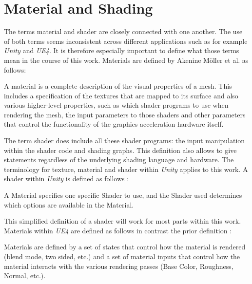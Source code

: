 \section{Material and Shading}\label{chapter:materials}

	The terms material and shader are closely connected with one another. The use of both terms seems inconsistent across different applications such as for example \emph{Unity} and \emph{UE4}. It is therefore especially important to define what those terms mean in the course of this work. Materials are defined by Akenine Möller et al. \cite[p.\,468]{akenine2008real} as follows:
	
	\begin{itquote}	
		A material is a complete description of the visual properties of a mesh. This includes a specification of the textures that are mapped to its surface and also various higher-level properties, such as which shader programs to use when rendering the mesh, the input parameters to those shaders and other parameters that control the functionality of the graphics acceleration hardware itself.
	\end{itquote} %

	The term shader does include all these shader programs: the input manipulation within the shader code and shading graphs. This definition also allows to give statements regardless of the underlying shading language and hardware. The terminology for texture, material and shader within \emph{Unity} applies to this work. A shader within \emph{Unity} is defined as follows \cite{unity2017textureShaderMat}: 

	\begin{itquote}
		A Material specifies one specific Shader to use, and the Shader used determines which options are available in the Material.
	\end{itquote} %
	This simplified definition of a shader will work for most parts within this work. Materials within \emph{UE4} are defined as follows in contrast the prior definition \cite{epic2017materialDef}:
	\begin{itquote}		
		Materials are defined by a set of states that control how the material is rendered (blend mode, two sided, etc.) and a set of material inputs that control how the material interacts with the various rendering passes (Base Color, Roughness, Normal, etc.).
	\end{itquote} %
	
